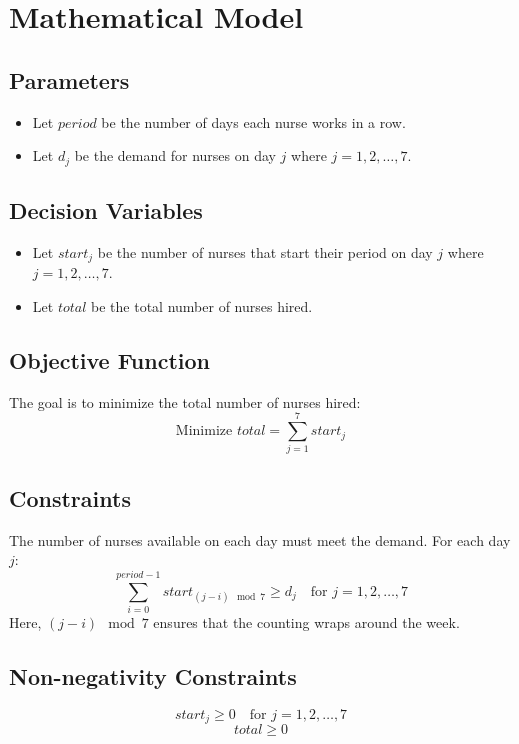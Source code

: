 \documentclass{article}
\begin{document}
\section*{Mathematical Model}

\subsection*{Parameters}
\begin{itemize}
    \item Let \( period \) be the number of days each nurse works in a row.
    \item Let \( d_j \) be the demand for nurses on day \( j \) where \( j = 1, 2, \ldots, 7 \).
\end{itemize}

\subsection*{Decision Variables}
\begin{itemize}
    \item Let \( start_j \) be the number of nurses that start their period on day \( j \) where \( j = 1, 2, \ldots, 7 \).
    \item Let \( total \) be the total number of nurses hired.
\end{itemize}

\subsection*{Objective Function}
The goal is to minimize the total number of nurses hired:
\[
\text{Minimize } total = \sum_{j=1}^{7} start_j
\]

\subsection*{Constraints}
The number of nurses available on each day must meet the demand. For each day \( j \):
\[
\sum_{i=0}^{period-1} start_{(j-i) \mod 7} \geq d_j \quad \text{for } j = 1, 2, \ldots, 7
\]
Here, \( (j-i) \mod 7 \) ensures that the counting wraps around the week.

\subsection*{Non-negativity Constraints}
\[
start_j \geq 0 \quad \text{for } j = 1, 2, \ldots, 7
\]
\[
total \geq 0
\]
\end{document}
